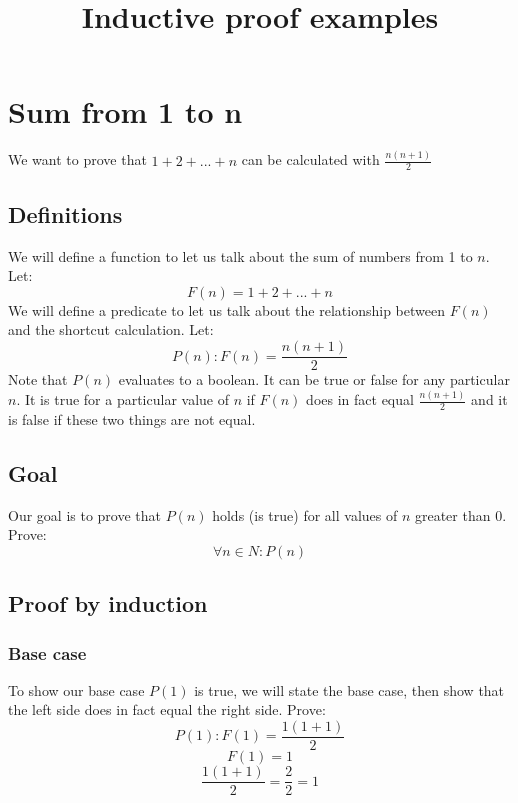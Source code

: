 \documentclass{article}
\title{Inductive proof examples}
\begin{document}
\section{Sum from 1 to n}
We want to prove that \(1 + 2 + ... + n \) can be calculated with \( \frac{n(n+1)}{2} \)
\subsection{Definitions}
We will define a function to let us talk about the sum of numbers from 1 to $n$. Let:
\begin{equation}
F(n) = 1 + 2 + ... + n
\end{equation}
We will define a predicate to let us talk about the relationship between $F(n)$ and the shortcut calculation. Let:
\begin{equation}
P(n): F(n) = \frac{n(n + 1)}{2}
\end{equation}
Note that $P(n)$ evaluates to a boolean. It can be true or false for any particular $n$. It is true for a particular value of $n$ if $F(n)$ does in fact equal \( \frac{n(n + 1)}{2} \) and it is false if these two things are not equal.

\subsection{Goal}
Our goal is to prove that $P(n)$ holds (is true) for all values of $n$ greater than 0. Prove:
\begin{equation}
\forall n \in N : P(n)
\end{equation}

\subsection{Proof by induction}
\subsubsection{Base case}
To show our base case $P(1)$ is true, we will state the base case, then show that the left side does in fact equal the right side. Prove:
\begin{equation}
P(1): F(1) = \frac{1(1 + 1)}{2}
\end{equation}
\[ F(1) = 1 \]
\[ \frac{1(1 + 1)}{2} = \frac{2}{2} = 1 \]
\end{document}
